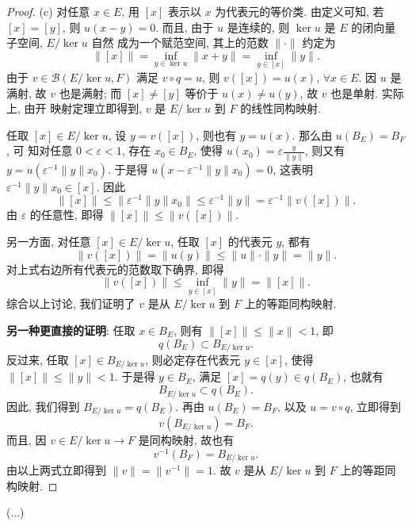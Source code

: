 \begin{proof}
    (c) 对任意 $x\in E$, 用 $[x]$ 表示以 $x$ 为代表元的等价类. 由定义可知, 若 $[x]=[y]$, 则
    $u(x-y)=0$. 而且, 由于 $u$ 是连续的, 则 $\ker u$ 是 $E$ 的闭向量子空间, $E/\ker u$ 自然
    成为一个赋范空间, 其上的范数 $\|\cdot\|$ 约定为
    \[\|[x]\|=\inf_{y\in\ker u}\|x+y\|=\inf_{y\in[x]}\|y\|.\]
    由于 $v\in\mathcal{B}(E/\ker u, F)$ 满足 $v\circ q=u$, 则 $v([x])=u(x)$, $\forall x\in E$. 
    因 $u$ 是满射, 故 $v$ 也是满射; 而 $[x]\neq[y]$ 等价于 $u(x)\neq u(y)$, 故 $v$ 也是单射. 实际上, 由开
    映射定理立即得到, $v$ 是 $E/\ker u$ 到 $F$ 的线性同构映射.

    任取 $[x]\in E/\ker u$, 设 $y=v([x])$, 则也有 $y=u(x)$. 那么由 $u(B_{E})=B_{F}$, 可
    知对任意 $0<\varepsilon<1$, 存在 $x_{0}\in B_{E}$, 使得 
    $u(x_0)=\varepsilon \frac{y}{\|y\|}$, 则又有 $y=u(\varepsilon^{-1}\|y\| x_{0})$.
    于是得 $u(x-\varepsilon^{-1}\|y\| x_{0})=0$, 这表明 $\varepsilon^{-1}\|y\| x_{0}\in [x]$. 因此
    \[
    \|[x]\| \leq\bigl\|\varepsilon^{-1}\|y\|x_{0}\bigr\|\leq\varepsilon^{-1}\|y\|=\varepsilon^{-1}\|v([x])\| .
    \]
    由 $\varepsilon$ 的任意性, 即得 $\|[x]\|\leq\|v([x])\|$.

    另一方面, 对任意 $[x]\in E/\ker u$, 任取 $[x]$ 的代表元 $y$, 都有
    \[
    \|v([x])\|=\|u(y)\| \leq\|u\|\cdot\|y\|=\|y\|.
    \]
    对上式右边所有代表元的范数取下确界, 即得
    \[\|v([x])\|\leq\inf_{y\in [x]}\|y\|=\|[x]\|.\]
    综合以上讨论, 我们证明了 $v$ 是从 $E/\ker u$ 到 $F$ 上的等距同构映射.

    \textbf{另一种更直接的证明}:
    任取 $x\in B_E$, 则有 $\|[x]\|\leq\|x\|<1$, 即
    \[q(B_E)\subset B_{E/\ker u}.\]
    反过来, 任取 $[x]\in B_{E/\ker u}$, 则必定存在代表元 $y\in[x]$, 
    使得 $\|[x]\|\leq\|y\|<1$. 于是得 $y\in B_{E}$, 满足 $[x]=q(y)\in q(B_{E})$, 也就有
    \[
    B_{E/\ker u}\subset q(B_{E}).
    \]
    因此, 我们得到 $B_{E/\ker u}=q(B_{E})$. 再由 $u(B_{E})=B_{F}$, 以及 $u=v \circ q$, 立即得到
    \[
    v(B_{E/\ker u})=B_{F}.
    \]
    而且, 因 $v\in E/\ker u\to F$ 是同构映射, 故也有
    \[
    v^{-1}(B_{F})=B_{E/\ker u}.
    \]
    由以上两式立即得到 $\|v\|=\|v^{-1}\|=1$. 故 $v$ 是从 $E/\ker u$ 到 $F$ 上的等距同构映射.
\end{proof}


\begin{exercise}
  (...)
\end{exercise}

